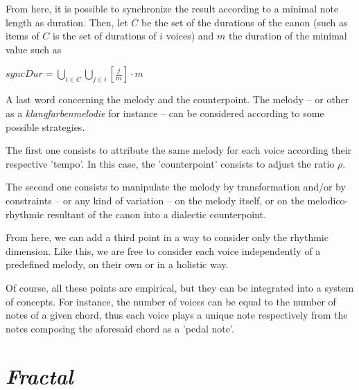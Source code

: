 From here, it is possible to synchronize the result according to a minimal note length as duration. Then, let $C$ be the set of the durations of the canon (such as items of $C$ is the set of durations of $i$ voices) and $m$ the duration of the minimal value such as

\bigskip

$syncDur = \displaystyle \bigcup\limits_{i \in C} \bigcup\limits_{j \in i} \displaystyle \left [ \frac{j}{m} \right ] \cdot m$
 
\bigskip 
\bigskip
 
 A last word concerning the melody and the counterpoint. The melody -- or other as a \textit{klangfarbenmelodie} for instance -- can be considered according to some possible strategies.

The first one consists to attribute the same melody for each voice according their respective 'tempo'. In this case, the 'counterpoint' consists to adjust the ratio $\rho$.

The second one consists to manipulate the melody by transformation and/or by constraints -- or any kind of variation -- on the melody itself, or on the melodico-rhythmic resultant of the canon into a dialectic counterpoint. 

From here, we can add a third point in a way to consider only the rhythmic dimension. Like this, we are free to consider each voice independently of a predefined melody, on their own or in a holistic way.

Of course, all these points are empirical, but they can be integrated into a system of concepts.
For instance, the number of voices can be equal to the number of notes of a given chord, thus each voice plays a unique note respectively from the notes composing the aforesaid chord as a 'pedal note'.


\section{\textsl{Fractal}}

\label{imp3}


